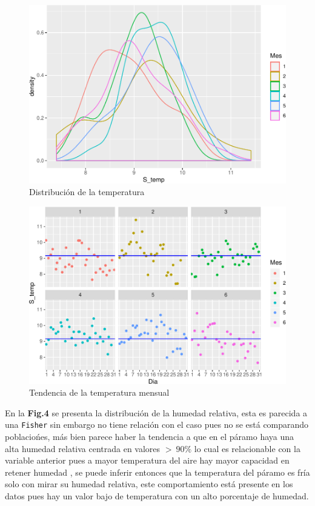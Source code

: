\documentclass[conference,final,]{IEEEtran}
\makeatletter
\def\maxwidth{\ifdim\Gin@nat@width>\linewidth\linewidth
\else\Gin@nat@width\fi}
\let\Oldincludegraphics\includegraphics
\renewcommand{\includegraphics}[1]{\Oldincludegraphics[width=\maxwidth]{#1}}
\makeatother
\begin{document}
\begin{figure}
\centering
\includegraphics{Hidrology_files/figure-latex/unnamed-chunk-5-1.pdf}
\caption{Distribución de la temperatura}
\end{figure}

\begin{figure}
\centering
\includegraphics{Hidrology_files/figure-latex/unnamed-chunk-6-1.pdf}
\caption{Tendencia de la temperatura mensual}
\end{figure}

En la \textbf{Fig.4} se presenta la distribución de la humedad relativa,
esta es parecida a una \texttt{Fisher} sin embargo no tiene relación con
el caso pues no se está comparando poblaciońes, más bien parece haber la
tendencia a que en el páramo haya una alta humedad relativa centrada en
valores \(> \ 90 \%\) lo cual es relacionable con la variable anterior
pues a mayor temperatura del aire hay mayor capacidad en retener humedad
\cite{jaramillo}, se puede inferir entonces que la temperatura del
páramo es fría solo con mirar su humedad relativa, este comportamiento
está presente en los datos pues hay un valor bajo de temperatura con un
alto porcentaje de humedad.
\end{document}
